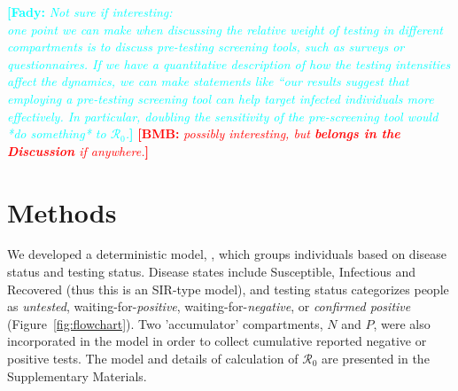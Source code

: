 \documentclass[12pt]{article}
\newcommand{\comment}{\showcomment}
\newcommand{\showcomment}[3]{\textcolor{#1}{\textbf{[#2: }\textsl{#3}\textbf{]}}}
\newcommand{\fady}[1]{\comment{cyan}{Fady}{#1}}
\newcommand{\bmb}[1]{\comment{red}{BMB}{#1}}
\newcommand{\Rnum}{\mathcal{R}_0}
\theoremstyle{definition} %
\begin{document}
\fady{Not sure if interesting: \\
  one point we can make when discussing the relative weight of testing in different compartments is to discuss pre-testing screening tools, such as surveys or questionnaires. If we have a quantitative description of how the testing intensities affect the dynamics, we can make statements like ``our results suggest that employing a pre-testing screening tool can help target infected individuals more effectively. In particular, doubling the sensitivity of the pre-screening tool would *do something* to $\Rnum$.}
\bmb{possibly interesting, but \textbf{belongs in the Discussion} if anywhere.}


\section{Methods}

We developed a deterministic model, , which groups individuals based on disease status and testing status. Disease states include Susceptible, Infectious and Recovered (thus this is an SIR-type model), and testing status categorizes people as \emph{untested}, waiting-for-\emph{positive}, waiting-for-\emph{negative}, or \emph{confirmed positive} (Figure~\ref{fig:flowchart}). Two 'accumulator' compartments, $N$ and $P$, were also incorporated in the model in order to collect cumulative reported negative or positive tests. The model and details of calculation of $\Rnum$ are presented in the Supplementary Materials.
\end{document}
